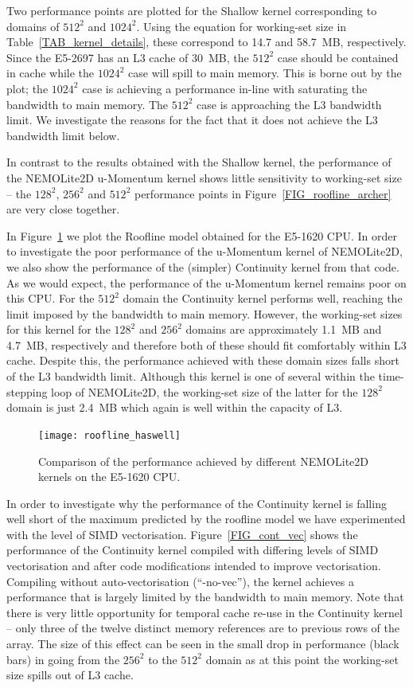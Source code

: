 \documentclass[12pt]{article}
\begin{document}
Two performance points are plotted for the Shallow kernel
corresponding to domains of $512^2$ and $1024^2$. Using the equation
for working-set size in Table~\ref{TAB_kernel_details}, these
correspond to 14.7 and 58.7~MB, respectively. Since the E5-2697 has
an L3 cache of 30~MB, the $512^2$ case should be contained in cache
while the $1024^2$ case will spill to main memory. This is borne out
by the plot; the $1024^2$ case is achieving a performance in-line
with saturating the bandwidth to main memory. The $512^2$ case is
approaching the L3 bandwidth limit. We investigate the reasons for
the fact that it does not achieve the L3 bandwidth limit below.
 
In contrast to the results obtained with the Shallow kernel, the
performance of the NEMOLite2D u-Momentum kernel shows little
sensitivity to working-set size -- the $128^2$, $256^2$ and $512^2$
performance points in Figure~\ref{FIG_roofline_archer} are very close
together.

In Figure~\ref{FIG_roofline_haswell} we plot the Roofline model
obtained for the E5-1620 CPU. In order to investigate the poor
performance of the u-Momentum kernel of NEMOLite2D, we also show the
performance of the (simpler) Continuity kernel from that code. As we
would expect, the performance of the u-Momentum kernel remains poor on
this CPU. For the $512^2$ domain the Continuity kernel performs well,
reaching the limit imposed by the bandwidth to main memory. However,
the working-set sizes for this kernel for the $128^2$ and $256^2$
domains are approximately 1.1~MB and 4.7~MB, respectively and therefore
both of these should fit comfortably within L3 cache. Despite this,
the performance achieved with these domain sizes falls short of the L3
bandwidth limit.  Although this kernel is one of several within the
time-stepping loop of NEMOLite2D, the working-set size of the latter
for the $128^2$ domain is just 2.4~MB which again is well within the
capacity of L3.

\begin{figure}
\centering
\texttt{[image: roofline\_haswell]}
\caption{Comparison of the performance achieved by different
  NEMOLite2D kernels on the E5-1620 CPU.}
\label{FIG_roofline_haswell}
\end{figure}

In order to investigate why the performance of the Continuity kernel
is falling well short of the maximum predicted by the roofline model
we have experimented with the level of SIMD
vectorisation. Figure~\ref{FIG_cont_vec} shows the performance of the
Continuity kernel compiled with differing levels of SIMD vectorisation
and after code modifications intended to improve vectorisation.
Compiling without auto-vectorisation (``-no-vec''), the kernel
achieves a performance that is largely limited by the bandwidth to
main memory. Note that there is very little opportunity for temporal
cache re-use in the Continuity kernel -- only three of the twelve
distinct memory references are to previous rows of the array. The size
of this effect can be seen in the small drop in performance (black
bars) in going from the $256^2$ to the $512^2$ domain as at this point
the working-set size spills out of L3 cache.
\end{document}

